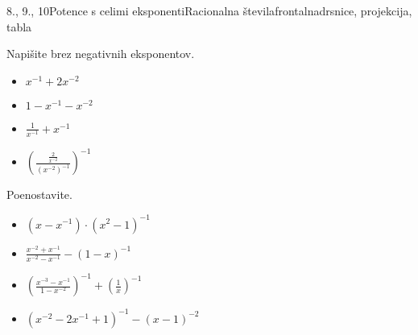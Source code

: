 \begin{priprava}{8., 9., 10}{}{Potence s celimi eksponenti}{Racionalna števila}{frontalna}{drsnice, projekcija, tabla}
\begin{multicols}{2}
            \begin{naloga}
                Napišite brez negativnih eksponentov.
                \begin{itemize}
                    \item $x^{-1}+2x^{-2}$ 
                    \item $1-x^{-1}-x^{-2}$ 
                    \item $\frac{1}{x^{-1}}+x^{-1}$ 
                    \item $\left(\frac{\frac{2}{x^{-2}}}{\left(x^{-2}\right)^{-1}}\right)^{-1}$ 
                \end{itemize}
            \end{naloga}
        

            \begin{naloga}
                Poenostavite.
                \begin{itemize}
                    \item $\left(x-x^{-1}\right)\cdot\left(x^2-1\right)^{-1}$ 
                    \item $\frac{x^{-2}+x^{-1}}{x^{-2}-x^{-1}}-\left(1-x\right)^{-1}$ 
                    \item $\left(\frac{x^{-3}-x^{-1}}{1-x^{-2}}\right)^{-1}+\left(\frac{1}{x}\right)^{-1}$ 
                    \item $\left(x^{-2}-2x^{-1}+1\right)^{-1}-\left(x-1\right)^{-2}$ 
                \end{itemize}
            \end{naloga}

        \end{multicols}
\end{priprava}